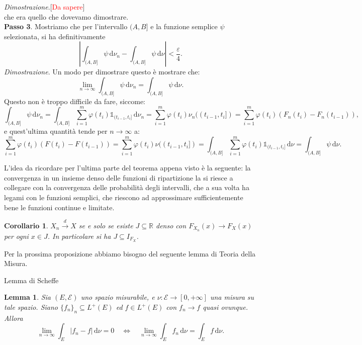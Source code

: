 \documentclass[11pt]{book}
\makeatletter
\theoremstyle{Definizione}
\theoremstyle{TeoremaProposizioneLemmaCorollario}
\newtheorem{mylem}[myteo]{Lemma}
\newtheorem{mycor}[myteo]{Corollario}
\theoremstyle{OsservazioneNota}
\renewenvironment{proof}[1][\proofname]{\par
  \normalfont \topsep6\p@\@plus6\p@\relax
  \trivlist
  \item[\hskip\labelsep
        \itshape
    #1\@addpunct{.}]\ignorespaces
}{%
  \endtrivlist\@endpefalse
}
\newcommand{\R}{\mathbb{R}}
\renewcommand{\d}{\mathrm{d}}
\newcommand{\uno}[1]{\mathds{1}_{#1}}
\newcommand{\tod}{\overset{d}{\to}}
\renewenvironment{proof}{\textsl{Dimostrazione}.}{}
\makeatother
\begin{document}
\begin{boxteo}{}
\begin{proof}[\textcolor{red}{Da sapere}]
$$$$
che era quello che dovevamo dimostrare.\\
\textbf{Passo 3}. Mostriamo che per l'intervallo $(A,B]$ e la funzione semplice $\psi$ selezionata, si ha definitivamente
$$
\left|\int_{(A,B]}\psi \,\d\nu_n-\int_{(A,B]}\psi \,\d\nu\right| < \frac{\varepsilon}{4}.
$$
\textsl{Dimostrazione}. Un modo per dimostrare questo è mostrare che:
$$
\lim_{n\to\infty} \int_{(A,B]}\psi \,\d\nu_n = \int_{(A,B]} \psi \,\d\nu.
$$
Questo non è troppo difficile da fare, siccome:
$$
\int_{(A,B]}\psi \,\d\nu_n = \int_{(A,B]} \sum_{i = 1}^m \varphi(t_i) \uno{(t_{i-1},t_i]} \,\d\nu_n = \sum_{i = 1}^m\varphi(t_i) \nu_n((t_{i-1},t_i]) = \sum_{i = 1}^m \varphi(t_i) (F_n(t_i)-F_{n}(t_{i-1})),
$$
e quest'ultima quantità tende per $n\to \infty$ a:
$$
\sum_{i = 1}^m \varphi(t_i)(F(t_i)-F(t_{i-1})) = \sum_{ i = 1}^m \varphi(t_i) \nu((t_{i-1},t_i]) = \int_{(A,B]} \sum_{i = 1}^m \varphi(t_i)\uno{(t_{i-1},t_i]}\,\d\nu = \int_{(A,B]}\psi \,\d\nu.
$$
\end{proof}
\end{boxteo}
\noindent
L'idea da ricordare per l'ultima parte del teorema appena visto è la seguente:  la convergenza in un insieme denso delle funzioni di ripartizione la si riesce a collegare con la convergenza delle probabilità degli intervalli, che a sua volta ha legami con le funzioni semplici, che riescono ad approssimare sufficientemente bene le funzioni continue e limitate.
\begin{boxoss}
\begin{mycor}
$X_n \tod X$ se e solo se esiste $J\subseteq \R$ denso con $F_{X_n}(x) \to F_X(x)$ per ogni $x\in J$. In particolare si ha $J \subseteq I_{F_X}$.
\end{mycor}
\end{boxoss}
\noindent
Per la prossima proposizione abbiamo bisogno del seguente lemma di Teoria della Misura.
\begin{boxlem}{Lemma di Scheffe}
\begin{mylem}
Sia $(E,\mathcal{E})$ uno spazio misurabile, e $\nu:\mathcal{E}\longrightarrow [0,+\infty]$ una misura su tale spazio. Siano $\{f_n\}_n\subseteq L^+(E)$ ed $f\in L^+(E)$ con $f_n \to f$ quasi ovunque. Allora
$$
\lim_{n \to \infty} \int_E |f_n-f|\,\d\nu = 0\quad \iff \quad \lim_{n \to \infty} \int_E f_n \,\d\nu = \int_E f \,\d\nu.
$$
\end{mylem}
\end{boxlem}
\end{document}
